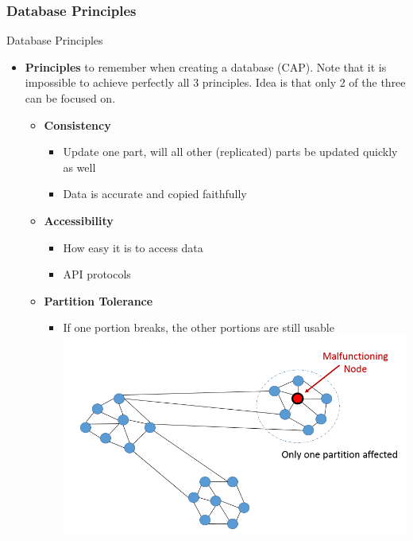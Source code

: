 \documentclass{beamer}
\begin{document}
    \subsubsection{Database Principles}
    \begin{frame}{Database Principles}
        \begin{itemize}
            \item \textbf{Principles} to remember when creating a database (CAP). Note that it is impossible to achieve perfectly all 3 principles. \cite{cap}Idea is that only 2 of the three can be focused on. \cite[Ch.~19]{Silberschatz2010}
            \begin{itemize}
                \item \textbf{Consistency}
                \begin{itemize}
                    \item Update one part, will all other (replicated) parts be updated quickly as well
                    \item Data is accurate and copied faithfully
                \end{itemize}
                \item \textbf{Accessibility}
                \begin{itemize}
                    \item How easy it is to access data
                    \item API protocols
                \end{itemize}
                \item  \textbf{Partition Tolerance}
                \begin{itemize}
                    \item If one portion breaks, the other portions are still usable
                    \centering 
                    \includegraphics[scale=0.2]{partition_tolerance.png}
                    \end{itemize} 
             \end{itemize}
        \end{itemize}
    \end{frame}
\end{document}
